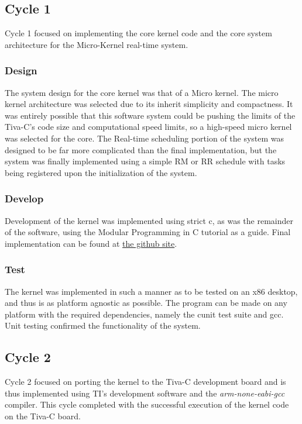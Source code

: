 \documentclass{article}
\begin{document}
\subsection*{Cycle 1}

Cycle 1 focused on implementing the core kernel code and the core system architecture for the Micro-Kernel real-time system.

\subsubsection*{Design}
The system design for the core kernel was that of a Micro kernel\cite{microkernel}.  The micro kernel architecture was selected due to its inherit simplicity and compactness.  It was entirely possible that this software system could be pushing the limits of the Tiva-C's code size and computational speed limits, so a high-speed micro kernel was selected for the core.  The Real-time scheduling portion of the system was designed to be far more complicated than the final implementation, but the system was finally implemented using a simple RM or RR schedule with tasks being registered upon the initialization of the system.

\subsubsection*{Develop}
Development of the kernel was implemented using strict c, as was the remainder of the software, using the Modular Programming in C\cite{modular-c} tutorial as a guide.  Final implementation can be found at \href{https://github.com/Shamshel/ECE5770/commit/c00127be4eaf347272067aba7e434a1e986104e6}{the github site}.

\subsubsection*{Test}
The kernel was implemented in such a manner as to be tested on an x86 desktop, and thus is as platform agnostic as possible.  The program can be made on any platform with the required dependencies, namely the cunit test suite and gcc.  Unit testing confirmed the functionality of the system.

\subsection*{Cycle 2}

Cycle 2 focused on porting the kernel to the Tiva-C development board and is thus implemented using TI's development software and the \emph{arm-none-eabi-gcc} compiler.  This cycle completed with the successful execution of the kernel code on the Tiva-C board.
\end{document}
